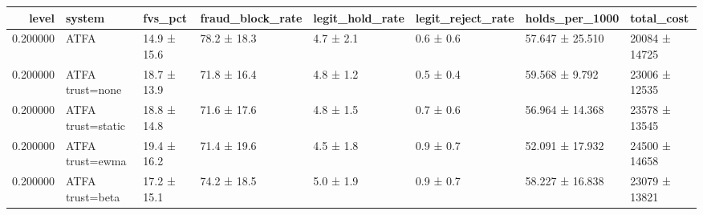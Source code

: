 \begin{tabular}{rlllllll}
\toprule
level & system & fvs\_pct & fraud\_block\_rate & legit\_hold\_rate & legit\_reject\_rate & holds\_per\_1000 & total\_cost \\
\midrule
0.200000 & ATFA & 14.9 ± 15.6 & 78.2 ± 18.3 & 4.7 ± 2.1 & 0.6 ± 0.6 & 57.647 ± 25.510 & 20084 ± 14725 \\
0.200000 & ATFA trust=none & 18.7 ± 13.9 & 71.8 ± 16.4 & 4.8 ± 1.2 & 0.5 ± 0.4 & 59.568 ± 9.792 & 23006 ± 12535 \\
0.200000 & ATFA trust=static & 18.8 ± 14.8 & 71.6 ± 17.6 & 4.8 ± 1.5 & 0.7 ± 0.6 & 56.964 ± 14.368 & 23578 ± 13545 \\
0.200000 & ATFA trust=ewma & 19.4 ± 16.2 & 71.4 ± 19.6 & 4.5 ± 1.8 & 0.9 ± 0.7 & 52.091 ± 17.932 & 24500 ± 14658 \\
0.200000 & ATFA trust=beta & 17.2 ± 15.1 & 74.2 ± 18.5 & 5.0 ± 1.9 & 0.9 ± 0.7 & 58.227 ± 16.838 & 23079 ± 13821 \\
\bottomrule
\end{tabular}
